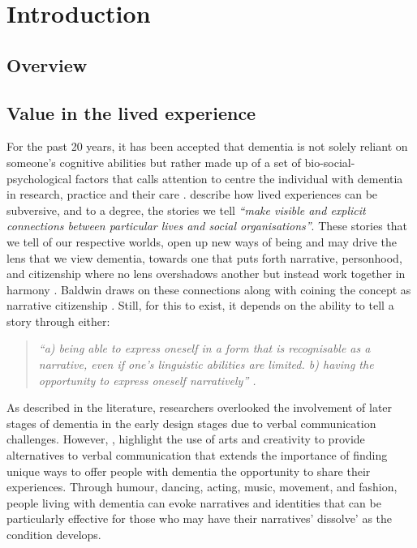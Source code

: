 \chapter{Introduction}

\section{Overview}
\label{Intro: Overiew}


\section{Value in the lived experience}
\label{Method:experience}
For the past 20 years, it has been accepted that dementia is not solely reliant on someone's cognitive abilities but rather made up of a set of bio-social-psychological factors that calls attention to centre the individual with dementia in research, practice and their care \citep{dewing_personhood_2008}. 
\cite{ewick_subversive_1995} describe how lived experiences can be subversive, and to a degree, the stories we tell \textit{``make visible and explicit connections between particular lives and social organisations''}. These stories that we tell of our respective worlds, open up new ways of being and may drive the lens that we view dementia, towards one that puts forth narrative, personhood, and citizenship where no lens overshadows another but instead work together in harmony \citep{dupuis_re-claiming_2016}. Baldwin draws on these connections along with coining the concept as narrative citizenship \citep{baldwin_narrative_2008}. Still, for this to exist, it depends on the ability to tell a story through either:
\begin{quote}
\textit{ ``a) being able to express oneself in a form that is recognisable as a narrative, even if one's linguistic abilities are limited. 
b) having the opportunity to express oneself narratively'' \citep{baldwin_narrative_2008}.  }
\end{quote}

As described in the literature, researchers overlooked the involvement of later stages of dementia in the early design stages due to verbal communication challenges. However, \citep{john_killick_claire_craig_creativity_2012}, highlight the use of arts and creativity to provide alternatives to verbal communication that extends the importance of finding unique ways to offer people with dementia the opportunity to share their experiences. Through humour, dancing, acting, music, movement, and fashion, people living with dementia can evoke narratives and identities that can be particularly effective for those who may have their narratives' dissolve' as the condition develops.

